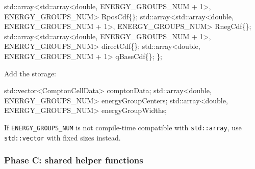 \documentclass[
]{article}
\newenvironment{Shaded}{}{}
\newcommand{\BuiltInTok}[1]{\textcolor[rgb]{0.00,0.50,0.00}{#1}}
\newcommand{\DataTypeTok}[1]{\textcolor[rgb]{0.56,0.13,0.00}{#1}}
\newcommand{\DecValTok}[1]{\textcolor[rgb]{0.25,0.63,0.44}{#1}}
\newcommand{\NormalTok}[1]{#1}
\newcommand{\OperatorTok}[1]{\textcolor[rgb]{0.40,0.40,0.40}{#1}}
\begin{document}
\begin{Shaded}
\begin{Highlighting}[]
    \BuiltInTok{std::}\NormalTok{array}\OperatorTok{\textless{}}\BuiltInTok{std::}\NormalTok{array}\OperatorTok{\textless{}}\DataTypeTok{double}\OperatorTok{,}\NormalTok{ ENERGY\_GROUPS\_NUM }\OperatorTok{+} \DecValTok{1}\OperatorTok{\textgreater{},}\NormalTok{ ENERGY\_GROUPS\_NUM}\OperatorTok{\textgreater{}}\NormalTok{ RposCdf}\OperatorTok{\{\};}
    \BuiltInTok{std::}\NormalTok{array}\OperatorTok{\textless{}}\BuiltInTok{std::}\NormalTok{array}\OperatorTok{\textless{}}\DataTypeTok{double}\OperatorTok{,}\NormalTok{ ENERGY\_GROUPS\_NUM }\OperatorTok{+} \DecValTok{1}\OperatorTok{\textgreater{},}\NormalTok{ ENERGY\_GROUPS\_NUM}\OperatorTok{\textgreater{}}\NormalTok{ RnegCdf}\OperatorTok{\{\};}
    \BuiltInTok{std::}\NormalTok{array}\OperatorTok{\textless{}}\BuiltInTok{std::}\NormalTok{array}\OperatorTok{\textless{}}\DataTypeTok{double}\OperatorTok{,}\NormalTok{ ENERGY\_GROUPS\_NUM }\OperatorTok{+} \DecValTok{1}\OperatorTok{\textgreater{},}\NormalTok{ ENERGY\_GROUPS\_NUM}\OperatorTok{\textgreater{}}\NormalTok{ directCdf}\OperatorTok{\{\};}
    \BuiltInTok{std::}\NormalTok{array}\OperatorTok{\textless{}}\DataTypeTok{double}\OperatorTok{,}\NormalTok{ ENERGY\_GROUPS\_NUM }\OperatorTok{+} \DecValTok{1}\OperatorTok{\textgreater{}}\NormalTok{ qBaseCdf}\OperatorTok{\{\};}
\OperatorTok{\};}
\end{Highlighting}
\end{Shaded}

Add the storage:

\begin{Shaded}
\begin{Highlighting}[]
\BuiltInTok{std::}\NormalTok{vector}\OperatorTok{\textless{}}\NormalTok{ComptonCellData}\OperatorTok{\textgreater{}}\NormalTok{ comptonData}\OperatorTok{;}
\BuiltInTok{std::}\NormalTok{array}\OperatorTok{\textless{}}\DataTypeTok{double}\OperatorTok{,}\NormalTok{ ENERGY\_GROUPS\_NUM}\OperatorTok{\textgreater{}}\NormalTok{ energyGroupCenters}\OperatorTok{;}
\BuiltInTok{std::}\NormalTok{array}\OperatorTok{\textless{}}\DataTypeTok{double}\OperatorTok{,}\NormalTok{ ENERGY\_GROUPS\_NUM}\OperatorTok{\textgreater{}}\NormalTok{ energyGroupWidths}\OperatorTok{;}
\end{Highlighting}
\end{Shaded}

If \texttt{ENERGY\_GROUPS\_NUM} is not compile-time compatible with
\texttt{std::array}, use \texttt{std::vector} with fixed sizes instead.

\subsubsection{Phase C: shared helper
functions}\label{phase-c-shared-helper-functions}
\end{document}
